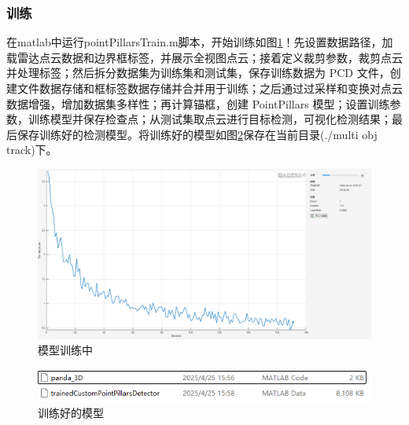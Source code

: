 \subsubsection{训练}
在matlab中运行pointPillarsTrain.m脚本，开始训练如图\ref{fig:p30}！先设置数据路径，加载雷达点云数据和边界框标签，并展示全视图点云；接着定义裁剪参数，裁剪点云并处理标签；然后拆分数据集为训练集和测试集，保存训练数据为 PCD 文件，创建文件数据存储和框标签数据存储并合并用于训练；之后通过过采样和变换对点云数据增强，增加数据集多样性；再计算锚框，创建 PointPillars 模型；设置训练参数，训练模型并保存检查点；从测试集取点云进行目标检测，可视化检测结果；最后保存训练好的检测模型。将训练好的模型如图\ref{fig:p11}保存在当前目录(./multi obj track)下。



\begin{figure}[htbp] %
	\centering
	\includegraphics[width=1\textwidth]{p30} %
	\caption{模型训练中} %
	\label{fig:p30} %
\end{figure}








\begin{figure}[htbp] %
	\centering
	\includegraphics[width=1\textwidth]{p11} %
	\caption{训练好的模型} %
	\label{fig:p11} %
\end{figure}






